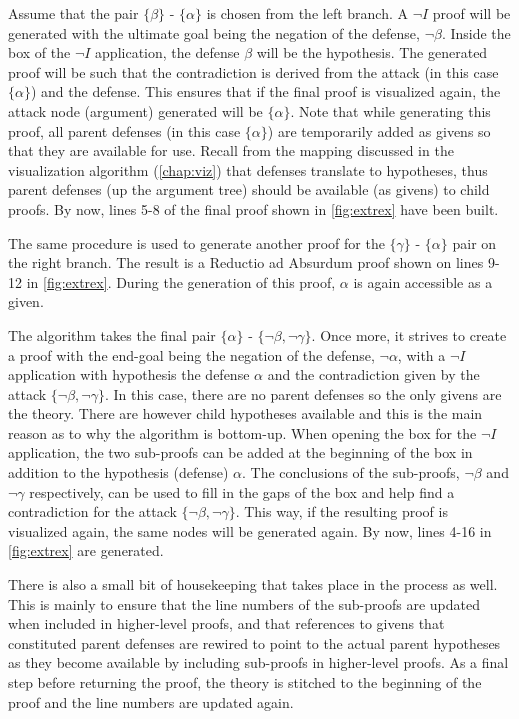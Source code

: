 \documentclass[11pt,twoside,a4paper]{report}
\begin{document}
Assume that the pair $\{\beta\}$ - $\{\alpha\}$ is chosen from the left branch. A $\neg I$ proof will be generated with the ultimate goal being the negation of the defense, $\neg\beta$. Inside the box of the $\neg I$ application, the defense $\beta$ will be the hypothesis. The generated proof will be such that the contradiction is derived from the attack (in this case $\{\alpha\}$) and the defense. This ensures that if the final proof is visualized again, the attack node (argument) generated will be $\{\alpha\}$. Note that while generating this proof, all parent defenses (in this case $\{\alpha\}$) are temporarily added as givens so that they are available for use. Recall from the mapping discussed in the visualization algorithm (\autoref{chap:viz}) that defenses translate to hypotheses, thus parent defenses (up the argument tree) should be available (as givens) to child proofs. By now, lines 5-8 of the final proof shown in \autoref{fig:extrex} have been built.

The same procedure is used to generate another proof for the $\{\gamma\}$ - $\{\alpha\}$ pair on the right branch. The result is a Reductio ad Absurdum proof shown on lines 9-12 in \autoref{fig:extrex}. During the generation of this proof, $\alpha$ is again accessible as a given.

The algorithm takes the final pair $\{\alpha\}$ - $\{\neg\beta, \neg\gamma\}$. Once more, it strives to create a proof with the end-goal being the negation of the defense, $\neg\alpha$, with a $\neg I$ application with hypothesis the defense $\alpha$ and the contradiction given by the attack $\{\neg\beta, \neg\gamma\}$. In this case, there are no parent defenses so the only givens are the theory. There are however child hypotheses available and this is the main reason as to why the algorithm is bottom-up. When opening the box for the $\neg I$ application, the two sub-proofs can be added at the beginning of the box in addition to the hypothesis (defense) $\alpha$. The conclusions of the sub-proofs, $\neg\beta$ and $\neg\gamma$ respectively, can be used to fill in the gaps of the box and help find a contradiction for the attack $\{\neg\beta, \neg\gamma\}$. This way, if the resulting proof is visualized again, the same nodes will be generated again. By now, lines 4-16 in \autoref{fig:extrex} are generated.

There is also a small bit of housekeeping that takes place in the process as well. This is mainly to ensure that the line numbers of the sub-proofs are updated when included in higher-level proofs, and that references to givens that constituted parent defenses are rewired to point to the actual parent hypotheses as they become available by including sub-proofs in higher-level proofs. As a final step before returning the proof, the theory is stitched to the beginning of the proof and the line numbers are updated again.
\end{document}
